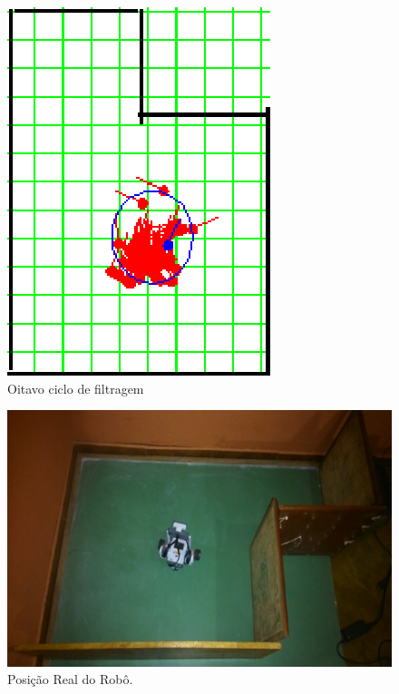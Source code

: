 \begin{figure}[H]
  \centering
  \includegraphics[scale=1]{figuras/cen4_ex5/9.eps}
  \caption[Oitavo Ciclo de Filtragem]{Oitavo ciclo de filtragem}
  \label{img:cen4_ex5_9}
\end{figure}

\begin{figure}[H]
  \centering
  \includegraphics[scale=1]{figuras/cen4_ex5/real.eps}
  \caption[Posição Real do Robô]{Posição Real do Robô.}
  \label{img:cen4_ex5_real}
\end{figure}
